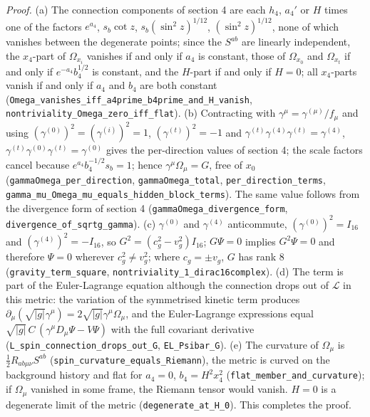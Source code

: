 \documentclass[11pt]{article}
\begin{document}
\emph{Proof.} (a) The connection components of section 4 are each $h_4$, $a_4'$ or $H$ times one of the factors $e^{a_4}$, $s_b\cot z$, $s_b(\sin^2 z)^{1/12}$, $(\sin^2 z)^{1/12}$, none of which vanishes between the degenerate points; since the $S^{ab}$ are linearly independent, the $x_4$-part of $\Omega_{x_i}$ vanishes if and only if $a_4$ is constant, those of $\Omega_{x_0}$ and $\Omega_{x_t}$ if and only if $e^{-a_4}b_4^{1/2}$ is constant, and the $H$-part if and only if $H = 0$; all $x_4$-parts vanish if and only if $a_4$ and $b_4$ are both constant (\texttt{Omega\_va\allowbreak{}nishes\_i\allowbreak{}ff\_a4pri\allowbreak{}me\_b4pri\allowbreak{}me\_and\_H\allowbreak{}\_vanish}, \texttt{nontrivi\allowbreak{}ality\_Om\allowbreak{}ega\_zero\allowbreak{}\_iff\_fla\allowbreak{}t}). (b) Contracting with $\gamma^\mu = \gamma^{(\mu)}/f_\mu$ and using $(\gamma^{(0)})^2 = (\gamma^{(i)})^2 = 1$, $(\gamma^{(t)})^2 = -1$ and $\gamma^{(t)}\gamma^{(4)}\gamma^{(t)} = \gamma^{(4)}$, $\gamma^{(t)}\gamma^{(0)}\gamma^{(t)} = \gamma^{(0)}$ gives the per-direction values of section 4; the scale factors cancel because $e^{a_4}b_4^{-1/2}s_b = 1$; hence $\gamma^\mu\Omega_\mu = G$, free of $x_0$ (\texttt{gammaOme\allowbreak{}ga\_per\_d\allowbreak{}irection}, \texttt{gammaOme\allowbreak{}ga\_total}, \texttt{per\_dire\allowbreak{}ction\_te\allowbreak{}rms}, \texttt{gamma\_mu\allowbreak{}\_Omega\_m\allowbreak{}u\_equals\allowbreak{}\_hidden\_\allowbreak{}block\_te\allowbreak{}rms}). The same value follows from the divergence form of section 4 (\texttt{gammaOme\allowbreak{}ga\_diver\allowbreak{}gence\_fo\allowbreak{}rm}, \texttt{divergen\allowbreak{}ce\_of\_sq\allowbreak{}rtg\_gamm\allowbreak{}a}). (c) $\gamma^{(0)}$ and $\gamma^{(4)}$ anticommute, $(\gamma^{(0)})^2 = I_{16}$ and $(\gamma^{(4)})^2 = -I_{16}$, so $G^2 = (c_g^2 - v_g^2)I_{16}$; $G\Psi = 0$ implies $G^2\Psi = 0$ and therefore $\Psi = 0$ wherever $c_g^2 \neq v_g^2$; where $c_g = \pm v_g$, $G$ has rank 8 (\texttt{gravity\_\allowbreak{}term\_squ\allowbreak{}are}, \texttt{nontrivi\allowbreak{}ality\_1\_\allowbreak{}dirac16c\allowbreak{}omplex}). (d) The term is part of the Euler-Lagrange equation although the connection drops out of $\mathcal{L}$ in this metric: the variation of the symmetrised kinetic term produces $\partial_\mu(\sqrt{|g|}\gamma^\mu) = 2\sqrt{|g|}\gamma^\mu\Omega_\mu$, and the Euler-Lagrange expressions equal $\sqrt{|g|}\,C\,(\gamma^\mu D_\mu\Psi - V\Psi)$ with the full covariant derivative (\texttt{L\_spin\_c\allowbreak{}onnectio\allowbreak{}n\_drops\_\allowbreak{}out\_G}, \texttt{EL\_Psiba\allowbreak{}r\_G}). (e) The curvature of $\Omega_\mu$ is $\frac12 R_{ab\mu\nu}S^{ab}$ (\texttt{spin\_cur\allowbreak{}vature\_e\allowbreak{}quals\_Ri\allowbreak{}emann}), the metric is curved on the background history and flat for $a_4 = 0$, $b_4 = H^2x_4^2$ (\texttt{flat\_mem\allowbreak{}ber\_and\_\allowbreak{}curvatur\allowbreak{}e}); if $\Omega_\mu$ vanished in some frame, the Riemann tensor would vanish. $H = 0$ is a degenerate limit of the metric (\texttt{degenera\allowbreak{}te\_at\_H\_\allowbreak{}0}). This completes the proof.
\end{document}
